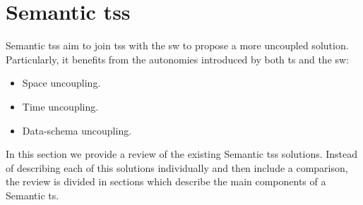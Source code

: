 \section{Semantic \aclp{ts}}
\label{sec:soa_tsc}


Semantic \aclp{ts} aim to join \aclp{ts} with the \acl{sw} to propose a more uncoupled solution.
Particularly, it benefits from the autonomies introduced by both \ac{ts} and the \ac{sw}:

\begin{itemize}
  \item Space uncoupling.
  \item Time uncoupling.
  \item Data-schema uncoupling. %
\end{itemize}


In this section we provide a review of the existing Semantic \aclp{ts} solutions. %
Instead of describing each of this solutions individually and then include a comparison,
the review is divided in sections which describe the main components of a Semantic \ac{ts}.




\newcommand{\midtsc}{\acs{tscm} \citep{fensel_tsc_2007}}
\newcommand{\midsws}{\acs{sws} \citep{tolksdorf_coordination_2006}}
\newcommand{\midstuples}{\acs{stuples} \citep{khushraj_stuples:_2004}}
\newcommand{\midcspaces}{\acs{cspaces} \citep{martinrecuerda_towards_2005}}
\newcommand{\midtscpp}{\acs{tscpp} \citep{krummenacher_open_2009,blunder_distributed_2009}}
\newcommand{\midtripcom}{\acs{tripcom} \citep{XXX}}
\newcommand{\midsmartmt}{\acs{smartm3} \citep{honkola_smart-m3_2010}}
\newcommand{\midnardini}{\citet{nardini_semantic_2013}}


